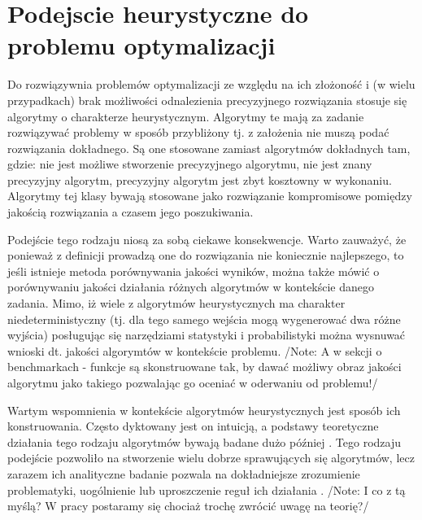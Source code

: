 \documentclass[11pt,a4paper]{report}
\begin{document}
{\section{Podejscie heurystyczne do problemu optymalizacji}
\par{
Do rozwiązywnia problemów optymalizacji ze względu na ich złożoność i (w wielu przypadkach) brak możliwości odnalezienia precyzyjnego rozwiązania stosuje się algorytmy o charakterze heurystycznym. Algorytmy te mają za zadanie rozwiązywać problemy w sposób przybliżony tj. z założenia nie muszą podać rozwiązania dokładnego. Są one stosowane zamiast algorytmów dokładnych tam, gdzie: nie jest możliwe stworzenie precyzyjnego algorytmu, nie jest znany precyzyjny algorytm, precyzyjny algorytm jest zbyt kosztowny w wykonaniu. Algorytmy tej klasy bywają stosowane jako rozwiązanie kompromisowe pomiędzy jakością rozwiązania a czasem jego poszukiwania.
}
\par{
Podejście tego rodzaju niosą za sobą ciekawe konsekwencje. Warto zauważyć, że ponieważ z definicji prowadzą one do rozwiązania nie koniecznie najlepszego, to jeśli istnieje metoda porównywania jakości wyników, można także mówić o porównywaniu jakości działania różnych algorytmów w kontekście danego zadania. Mimo, iż wiele z algorytmów heurystycznych ma charakter niedeterministyczny (tj. dla tego samego wejścia mogą wygenerować dwa różne wyjścia) posługując się narzędziami statystyki i probabilistyki można wysnuwać wnioski dt. jakości algorymtów w kontekście problemu. /Note: A w sekcji o benchmarkach - funkcje są skonstruowane tak, by dawać możliwy obraz jakości algorytmu jako takiego pozwalając go oceniać w oderwaniu od problemu!/
}
\par{
Wartym wspomnienia w kontekście algorytmów heurystycznych jest sposób ich konstruowania. Często dyktowany jest on intuicją, a podstawy teoretyczne działania tego rodzaju algorytmów bywają badane dużo później \cite{Opara}. Tego rodzaju podejście pozwoliło na stworzenie wielu dobrze sprawujących się algorytmów, lecz zarazem ich analityczne badanie pozwala na dokładniejsze zrozumienie problematyki, uogólnienie lub uproszczenie reguł ich działania \cite{Opara}. /Note: I co z tą myślą? W pracy postaramy się chociaż trochę zwrócić uwagę na teorię?/
}
\newpage
}
\end{document}
